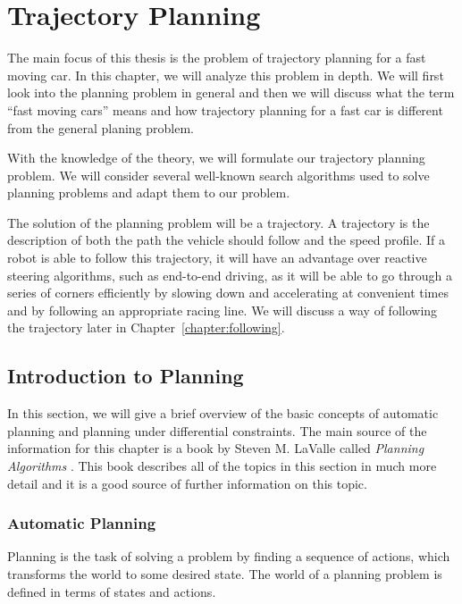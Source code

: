 \chapter{Trajectory Planning}
\label{chapter:trajectory_planning}

The main focus of this thesis is the problem of trajectory planning for a fast moving car. In this chapter, we will analyze this problem in depth. We will first look into the planning problem in general and then we will discuss what the term ``fast moving cars'' means and how trajectory planning for a fast car is different from the general planing problem.

With the knowledge of the theory, we will formulate our trajectory planning problem. We will consider several well-known search algorithms used to solve planning problems and adapt them to our problem.

The solution of the planning problem will be a trajectory. A trajectory is the description of both the path the vehicle should follow and the speed profile. If a robot is able to follow this trajectory, it will have an advantage over reactive steering algorithms, such as end-to-end driving, as it will be able to go through a series of corners efficiently by slowing down and accelerating at convenient times and by following an appropriate racing line. We will discuss a way of following the trajectory later in Chapter~\ref{chapter:following}.

\section{Introduction to Planning}

In this section, we will give a brief overview of the basic concepts of automatic planning and planning under differential constraints. The main source of the information for this chapter is a book by Steven M. LaValle called \textit{Planning Algorithms} \cite{lavalle_2006}. This book describes all of the topics in this section in much more detail and it is a good source of further information on this topic.

\subsection{Automatic Planning}

Planning is the task of solving a problem by finding a sequence of actions, which transforms the world to some desired state. The world of a planning problem is defined in terms of states and actions.

